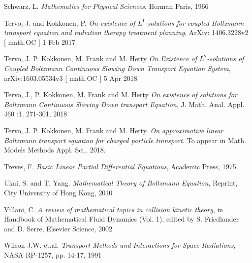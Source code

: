 \documentclass[a4paper,12pt,oneside,reqno]{amsart}
\theoremstyle{theorem}
\begin{document}
\begin{thebibliography}{5}
 Schwarz, L. \emph{Mathematics for Physical Sciences}, Herman Paris, 1966

 


 Tervo, J. and Kokkonen, P. \emph{On existence of $L^1$-solutions for coupled Boltzmann transport equation and  radiation therapy treatment planning}, ArXiv: 1406.3228v2 $[$ math.OC $]$ 1 Feb 2017 

 Tervo, J.  P. Kokkonen, M. Frank and M. Herty  \emph{On Existence of $L^2$-solutions of Coupled Boltzmann Continuous Slowing Down Transport Equation System}, arXiv:1603.05534v3 $[$ math.OC $]$ 5 Apr 2018

 Tervo, J.,  P. Kokkonen, M. Frank and M. Herty \emph{On existence of solutions for Boltzmann Continuous Slowing Down transport Equation}, J. Math. Anal. Appl. 460 :1, 271-301, 2018

 

 Tervo, J.  P. Kokkonen, M. Frank and M. Herty. \emph{On approximative linear Boltzmann transport equation for charged particle transport}. To appear in Math. Models Methods  Appl. Sci., 2018.

 Treves, F. \emph{Basic Linear Partial Differential Equations}, Academic Press, 1975

 Ukai, S. and T. Yang. \emph{Mathematical Theory of Boltzmann Equation}, Reprint, City University of Hong Kong, 2010 

  Villani, C. \emph{A review of mathematical topics in collision kinetic theory}, in Handbook of Mathematical Fluid Dynamics (Vol. 1), edited by S. Friedlander and D. Serre, Elsevier Science, 2002
 

 Wilson J.W. et.al. \emph{Transport Methods and Interactions for Space Radiations}, NASA RP-1257, pp. 14-17, 1991

\end{thebibliography} 
\end{document}
